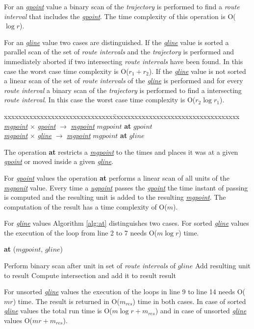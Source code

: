 \documentclass[a4paper]{article}
\newcommand{\op}[1]{\textbf{#1}}
\newcommand{\dt}[1]{\textsl{\underline{#1}}}
\begin{document}
For an \dt{gpoint} value a binary scan of the \textit{trajectory} is performed to find
a \textit{route interval} that includes the \dt{gpoint}. The time complexity of
this operation is O($\log r$).

For an \dt{gline} value two cases are distinguished. If the \dt{gline} value is
sorted a parallel scan of the set of
\textit{route intervals} and the \textit{trajectory} is performed and immediately
aborted if
two intersecting \textit{route intervals} have been found. In this case the
worst case
time complexity is O($r_1 + r_2$). If the \dt{gline} value is not sorted a
linear
scan of the set of \textit{route intervals} of the \dt{gline} is performed and
for
every \textit{route interval} a binary scan of the \textit{trajectory} is performed to
find
a intersecting \textit{route interval}. In this case the worst case time
complexity
is O($r_2 \log {r_1}$).
\begin{tabbing}
xxxxxxxxxxxxxxxxxxxxxxxxxxxxxx\=xxxxxxxxxxxxxxxxxxxxxxxxxxxxxxxxxxx\kill
\dt{mgpoint} $\times$ \dt{gpoint} $\rightarrow$ \dt{mgpoint} \> $mgpoint$
\op{at} $gpoint$\\
\dt{mgpoint} $\times$ \dt{gline} $\rightarrow$ \dt{mgpoint} \> $mgpoint$ \op{at}
$gline$\\
\end{tabbing}
The operation \op{at} restricts a \dt{mgpoint} to the times and places it was
at a given \dt{gpoint} or moved inside a given \dt{gline}.

For \dt{gpoint} values
the operation \op{at} performs a linear scan of all units of the \dt{mgponit}
value. Every time a \dt{ugpoint} passes the \dt{gpoint} the time instant of
passing is computed and the resulting unit is added to the resulting
\dt{mgpoint}.
The computation of the result has a time complexity of O($m$).

For \dt{gline} values Algorithm \ref{alg:at} distinguishes two cases. For sorted
\dt{gline} values the execution of the loop from line 2 to 7 needs O($m \log r$)
time.
\begin{algorithm}[H]
  \caption{\op{at} ($mgpoint$, $gline$)}
  \label{alg:at}
  \begin{algorithmic}[1]
        \STATE Perform binary scan after unit in set of \textit{route intervals} of $gline$
          \STATE Add resulting unit to result
        \ENDIF
      \ENDFOR
    \ELSE
            \STATE Compute intersection and add it to result
          \ENDIF
        \ENDFOR
      \ENDFOR
    \ENDIF
    \RETURN result
  \end{algorithmic}
\end{algorithm}
For unsorted \dt{gline} values the execution of the loops in line 9 to line 14
needs O($mr$) time. The result is returned in O($m_{res}$) time in both cases.
In case
of sorted \dt{gline} values the total run time is O($m \log {r} + m_{res}$)
and in case of unsorted \dt{gline} values O($mr + m_{res}$).
\end{document}
